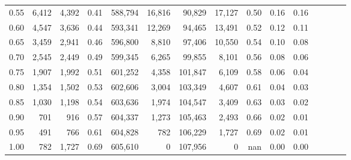 \begin{tabular}{rrrcrrrrrrrrrrr}
0.55 &    6,412 &   4,392 &                                       0.41 &  588,794 &   16,816 &   90,829 &   17,127 &  0.50 &  0.16 &                         0.16 \\
0.60 &    4,547 &   3,636 &                                       0.44 &  593,341 &   12,269 &   94,465 &   13,491 &  0.52 &  0.12 &                         0.11 \\
0.65 &    3,459 &   2,941 &                                       0.46 &  596,800 &    8,810 &   97,406 &   10,550 &  0.54 &  0.10 &                         0.08 \\
0.70 &    2,545 &   2,449 &                                       0.49 &  599,345 &    6,265 &   99,855 &    8,101 &  0.56 &  0.08 &                         0.06 \\
0.75 &    1,907 &   1,992 &                                       0.51 &  601,252 &    4,358 &  101,847 &    6,109 &  0.58 &  0.06 &                         0.04 \\
0.80 &    1,354 &   1,502 &                                       0.53 &  602,606 &    3,004 &  103,349 &    4,607 &  0.61 &  0.04 &                         0.03 \\
0.85 &    1,030 &   1,198 &                                       0.54 &  603,636 &    1,974 &  104,547 &    3,409 &  0.63 &  0.03 &                         0.02 \\
0.90 &      701 &     916 &                                       0.57 &  604,337 &    1,273 &  105,463 &    2,493 &  0.66 &  0.02 &                         0.01 \\
0.95 &      491 &     766 &                                       0.61 &  604,828 &      782 &  106,229 &    1,727 &  0.69 &  0.02 &                         0.01 \\
1.00 &      782 &   1,727 &                                       0.69 &  605,610 &        0 &  107,956 &        0 &   nan &  0.00 &                         0.00 \\
\bottomrule
\end{tabular}

